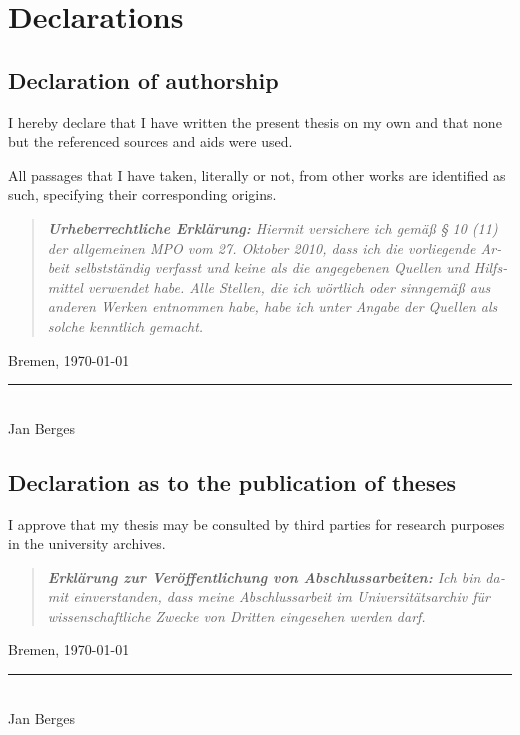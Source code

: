 

\chapter{Declarations}

\section*{Declaration of authorship}

I hereby declare that I have written the present thesis on my own and that none
but the referenced sources and aids were used.

All passages that I have taken, literally or not, from other works are
identified as such, specifying their corresponding origins.

\begin{otherlanguage}{ngerman}
    \begin{quote}
        \small \itshape
        \textbf{Urheberrechtliche Erklärung:}
        Hiermit versichere ich gemäß § 10 (11) der allgemeinen MPO vom 27.
        Oktober 2010, dass ich die vorliegende Arbeit selbstständig verfasst und
        keine als die angegebenen Quellen und Hilfsmittel verwendet habe.
        Alle Stellen, die ich wörtlich oder sinngemäß aus anderen Werken
        entnommen habe, habe ich unter Angabe der Quellen als solche kenntlich
        gemacht.
    \end{quote}
\end{otherlanguage}

Bremen, \today

\begin{flushright}
    \rule{3cm}{0.5pt} \\
    Jan Berges \\
\end{flushright}

\section*{Declaration as to the publication of theses}

I approve that my thesis may be consulted by third parties for research purposes
in the university archives.

\begin{otherlanguage}{ngerman}
    \begin{quote}
        \small \itshape
        \textbf{Erklärung zur Veröffentlichung von Abschlussarbeiten:}
        Ich bin damit einverstanden, dass meine Abschlussarbeit im
        Universitätsarchiv für wissenschaftliche Zwecke von Dritten eingesehen
        werden darf.
    \end{quote}
\end{otherlanguage}

Bremen, \today

\begin{flushright}
    \rule{3cm}{0.5pt} \\
    Jan Berges
\end{flushright}
